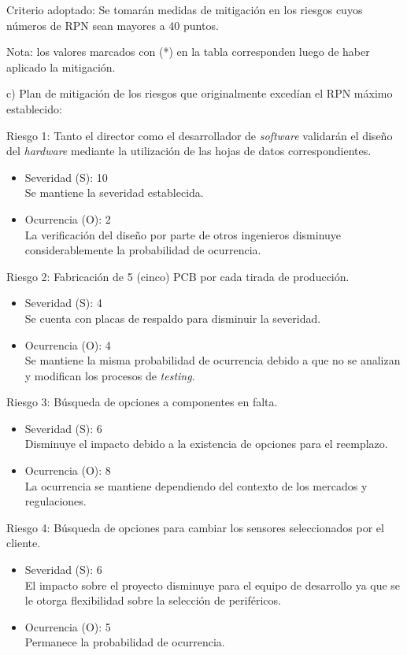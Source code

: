 \documentclass[
11pt, %
]{charter}
\begin{document}
Criterio adoptado: 
Se tomarán medidas de mitigación en los riesgos cuyos números de RPN sean mayores a 40 puntos.

Nota: los valores marcados con (*) en la tabla corresponden luego de haber aplicado la mitigación.

c) Plan de mitigación de los riesgos que originalmente excedían el RPN máximo establecido:
 
Riesgo 1: Tanto el director como el desarrollador de \textit{software} validarán el diseño del \textit{hardware} mediante la utilización de las hojas de datos correspondientes.
\begin{itemize}
	\item Severidad (S): 10 \\
		Se mantiene la severidad establecida.
	\item Ocurrencia (O): 2 \\
	La verificación del diseño por parte de otros ingenieros disminuye considerablemente la probabilidad de ocurrencia.
\end{itemize}

Riesgo 2: Fabricación de 5 (cinco) PCB por cada tirada de producción.
\begin{itemize}
	\item Severidad (S): 4\\
	Se cuenta con placas de respaldo para disminuir la severidad.
	\item Ocurrencia (O): 4\\
	Se mantiene la misma probabilidad de ocurrencia debido a que no se analizan y modifican los procesos de \textit{testing}.
\end{itemize}

Riesgo 3: Búsqueda de opciones a componentes en falta.
\begin{itemize}
	\item Severidad (S): 6\\
	Disminuye el impacto debido a la existencia de opciones para el reemplazo.
	\item Ocurrencia (O): 8\\
	La ocurrencia se mantiene dependiendo del contexto de los mercados y regulaciones.
	
\end{itemize}

Riesgo 4: Búsqueda de opciones para cambiar los sensores seleccionados por el cliente.
\begin{itemize}
	\item Severidad (S): 6\\
	El impacto sobre el proyecto disminuye para el equipo de desarrollo ya que se le otorga flexibilidad sobre la selección de periféricos.
	\item Ocurrencia (O): 5\\
	Permanece la probabilidad de ocurrencia.
	
\end{itemize}
\end{document}
